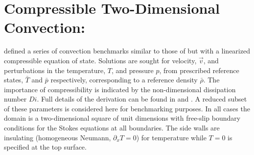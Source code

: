 %
%
%
%
%

\chapter{Compressible Two-Dimensional Convection: \citeauthor{KingGJI2010}} \label{sec:king}

\citet{KingGJI2010} defined a series of convection benchmarks similar to
those of 
\citet{BlankenbachGJI1989} 
but with a linearized
compressible equation of state.  Solutions are sought for velocity,
$\vec{v}$, and perturbations in the temperature, $T$, and pressure $p$,
from prescribed reference states, $\bar{T}$ and $\bar{p}$
respectively, corresponding to a reference density $\bar{\rho}$.
The importance of compressibility is indicated by the non-dimensional dissipation number 
$Di$.
Full details of the derivation can be found in
\citet{KingGJI2010} and \citet{SchubertCUP2001}.  A reduced subset of these
parameters is considered here for benchmarking purposes.  In all cases
the domain is a two-dimensional square of unit dimensions with
free-slip boundary conditions %
for the Stokes equations at all boundaries.  The side walls are insulating
(homogeneous Neumann, $\partial_x T = 0$) for temperature while $T=0$
is specified at the top surface.

